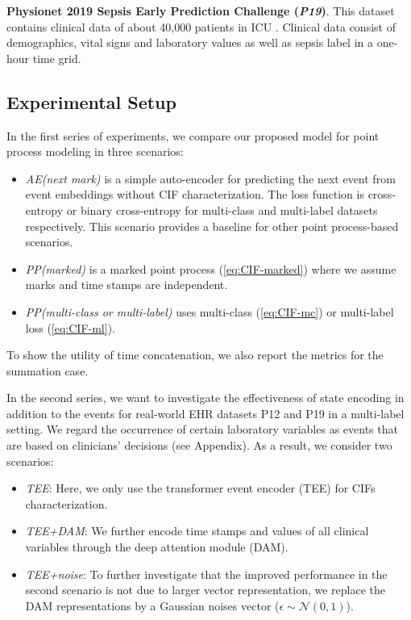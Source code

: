 \documentclass[journal,twoside,web]{ieeecolor}
\begin{document}
\textbf{Physionet 2019 Sepsis Early Prediction Challenge (\emph{P19})}.
This dataset contains clinical data of about 40,000 patients in ICU \cite*{reynaEarlyPredictionSepsis2020}. Clinical data consist of demographics, vital signs and laboratory values as well as sepsis label in a one-hour time grid.


\subsection*{Experimental Setup}

In the first series of experiments, we compare our proposed model for point process modeling in three scenarios:

\begin{itemize}
    \item \emph{AE(next mark)} is a simple auto-encoder for predicting the next event from event embeddings without CIF characterization. The loss function is cross-entropy or binary cross-entropy for multi-class and multi-label datasets respectively. This scenario provides a baseline for other point process-based scenarios.
    \item \emph{PP(marked)} is a marked point process (\ref*{eq:CIF-marked}) where we assume marks and time stamps are independent.
    \item \emph{PP(multi-class or multi-label)} uses multi-class (\ref*{eq:CIF-mc}) or multi-label loss (\ref*{eq:CIF-ml}).
\end{itemize}

To show the utility of time concatenation, we also report the metrics for the summation case.

In the second series, we want to investigate the effectiveness of state encoding in addition to the events for real-world EHR datasets P12 and P19 in a multi-label setting. We regard the occurrence of certain laboratory variables as events that are based on clinicians' decisions (see Appendix). As a result, we consider two scenarios:

\begin{itemize}
    \item \emph{TEE}: Here, we only use the transformer event encoder (TEE) for CIFs characterization.
    \item \emph{TEE+DAM}: We further encode time stamps and values of all clinical variables through the deep attention module (DAM).
    \item \emph{TEE+noise}: To further investigate that the improved performance in the second scenario is not due to larger vector representation, we replace the DAM representations by a Gaussian noises vector ($\epsilon \sim \mathcal{N} (0,1)$).
\end{itemize}
\end{document}
